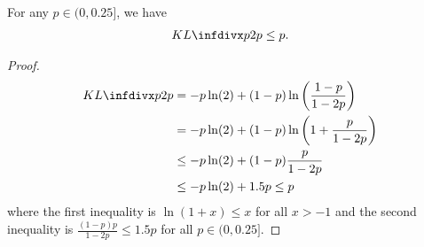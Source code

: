 \begin{lemma}
    For any $p \in (0, 0.25]$, we have 
    \begin{align*}
        \infdiv{p}{2p} \leq p.
    \end{align*}
    \label{lemma:KLp2pisp}
\end{lemma}
\begin{proof}
    \begin{align*}
        \infdiv{p}{2p} &= -p\ln(2) + (1-p)\ln\left(\frac{1-p}{1-2p}\right) \\
        &= -p\ln(2) + (1-p)\ln\left(1 + \frac{p}{1-2p}\right) \\
        &\leq -p\ln(2) + (1-p)\frac{p}{1-2p} \\
        &\leq -p\ln(2) + 1.5p \leq p
    \end{align*}
    where the first inequality is $\ln(1+x) \leq x$ for all $x > -1$ and the second inequality is $\frac{(1-p)p}{1-2p} \leq 1.5p$ for all $p \in (0, 0.25]$.
\end{proof}

